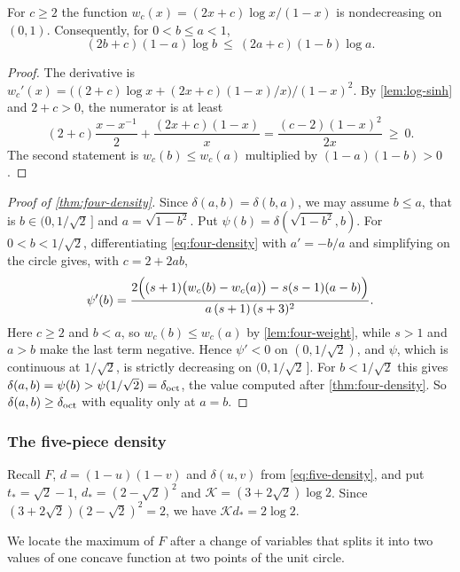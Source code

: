 \begin{lemma}\label{lem:four-weight}
For $c\ge2$ the function $w_c(x)=(2x+c)\log x/(1-x)$ is nondecreasing on $(0,1)$. Consequently,
for $0<b\le a<1$,
\[
 (2b+c)(1-a)\log b\ \le\ (2a+c)(1-b)\log a.
\]
\end{lemma}

\begin{proof}
The derivative is $w_c'(x)=\bigl((2+c)\log x+(2x+c)(1-x)/x\bigr)/(1-x)^2$. By
\cref{lem:log-sinh} and $2+c>0$, the numerator is at least
\[
 (2+c)\frac{x-x^{-1}}{2}+\frac{(2x+c)(1-x)}{x}=\frac{(c-2)(1-x)^2}{2x}\ \ge\ 0.
\]
The second statement is $w_c(b)\le w_c(a)$ multiplied by $(1-a)(1-b)>0$.
\end{proof}

\begin{proof}[Proof of \cref{thm:four-density}]
Since $\delta(a,b)=\delta(b,a)$, we may assume $b\le a$, that is $b\in(0,1/\sqrt2\,]$ and
$a=\sqrt{1-b^2}$. Put $\psi(b)=\delta(\sqrt{1-b^2},b)$. For $0<b<1/\sqrt2$, differentiating
\eqref{eq:four-density} with $a'=-b/a$ and simplifying on the circle gives, with $c=2+2ab$,
\begin{equation}\label{eq:four-derivative}
 \psi'(b)=\frac{2\Bigl((s+1)\bigl(w_c(b)-w_c(a)\bigr)-s(s-1)(a-b)\Bigr)}{a\,(s+1)\,(s+3)^2}.
\end{equation}
Here $c\ge2$ and $b<a$, so $w_c(b)\le w_c(a)$ by \cref{lem:four-weight}, while $s>1$ and $a>b$
make the last term negative. Hence $\psi'<0$ on $(0,1/\sqrt2)$, and $\psi$, which is continuous
at $1/\sqrt2$, is strictly decreasing on $(0,1/\sqrt2\,]$. For $b<1/\sqrt2$ this gives
$\delta(a,b)=\psi(b)>\psi(1/\sqrt2)=\delta_{\mathrm{oct}}$, the value computed after \cref{thm:four-density}.
So $\delta(a,b)\ge\delta_{\mathrm{oct}}$ with equality only at $a=b$.
\end{proof}

\subsubsection{The five-piece density}\label{app:five-density}

Recall $F$, $d=(1-u)(1-v)$ and $\delta(u,v)$ from \eqref{eq:five-density}, and put
$t_*=\sqrt2-1$, $d_*=(2-\sqrt2)^2$ and $\mathcal K=(3+2\sqrt2)\log2$. Since
$(3+2\sqrt2)(2-\sqrt2)^2=2$, we have $\mathcal K d_*=2\log2$.

We locate the maximum of $F$ after a change of variables that splits it into two values of one
concave function at two points of the unit circle.

